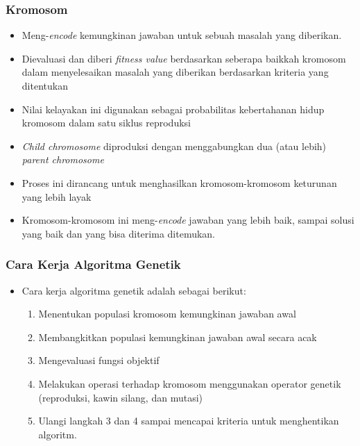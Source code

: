 \documentclass{beamer}
\begin{document}
\begin{frame}
\frametitle{Kromosom}
\begin{itemize}
\item Meng-\textit{encode} kemungkinan jawaban untuk sebuah masalah yang diberikan.
\item Dievaluasi dan diberi \textit{fitness value} berdasarkan seberapa baikkah kromosom dalam menyelesaikan masalah yang diberikan berdasarkan kriteria yang ditentukan
\item Nilai kelayakan ini digunakan sebagai probabilitas kebertahanan hidup kromosom dalam satu siklus reproduksi
\item \textit{Child chromosome} diproduksi dengan menggabungkan dua (atau lebih) \textit{parent chromosome}
\item Proses ini dirancang untuk menghasilkan kromosom-kromosom keturunan yang lebih layak
\item Kromosom-kromosom ini meng-\textit{encode} jawaban yang lebih baik, sampai solusi yang baik dan yang bisa diterima ditemukan.
\end{itemize}
\end{frame}


\begin{frame}
\frametitle{Cara Kerja Algoritma Genetik}
\begin{itemize}
\item Cara kerja algoritma genetik adalah sebagai berikut:
\begin{enumerate}
\item Menentukan populasi kromosom kemungkinan jawaban awal
\item Membangkitkan populasi kemungkinan jawaban awal secara acak
\item Mengevaluasi fungsi objektif
\item Melakukan operasi terhadap kromosom menggunakan operator genetik (reproduksi, kawin silang, dan mutasi)
\item Ulangi langkah 3 dan 4 sampai mencapai kriteria untuk menghentikan algoritm.
\end{enumerate}
\end{itemize}
\end{frame}
\end{document}
